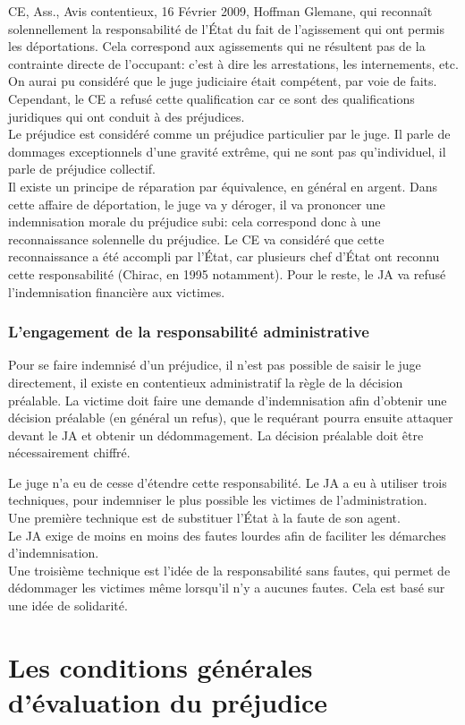 \documentclass[10pt, a4paper, openany]{book}
\begin{document}
CE, Ass., Avis contentieux, 16 Février 2009, Hoffman Glemane, qui reconnaît solennellement la responsabilité de l'État du fait de l'agissement qui ont permis les déportations. Cela correspond aux agissements qui ne résultent pas de la contrainte directe de l'occupant: c'est à dire les arrestations, les internements, etc. \\
On aurai pu considéré que le juge judiciaire était compétent, par voie de faits. Cependant, le CE a refusé cette qualification car ce sont des qualifications juridiques qui ont conduit à des préjudices. \\
Le préjudice est considéré comme un préjudice particulier par le juge. Il parle de dommages exceptionnels d'une gravité extrême, qui ne sont pas qu'individuel, il parle de préjudice collectif. \\
Il existe un principe de réparation par équivalence, en général en argent. Dans cette affaire de déportation, le juge va y déroger, il va prononcer une indemnisation morale du préjudice subi: cela correspond donc à une reconnaissance solennelle du préjudice. Le CE va considéré que cette reconnaissance a été accompli par l'État, car plusieurs chef d'État ont reconnu cette responsabilité (Chirac, en 1995 notamment). Pour le reste, le JA va refusé l'indemnisation financière aux victimes. 

\subsection{L'engagement de la responsabilité administrative}

Pour se faire indemnisé d'un préjudice, il n'est pas possible de saisir le juge directement, il existe en contentieux administratif la règle de la décision préalable. La victime doit faire une demande d'indemnisation afin d'obtenir une décision préalable (en général un refus), que le requérant pourra ensuite attaquer devant le JA et obtenir un dédommagement. La décision préalable doit être nécessairement chiffré.


Le juge n'a eu de cesse d'étendre cette responsabilité. Le JA a eu à utiliser trois techniques, pour indemniser le plus possible les victimes de l'administration. \\
Une première technique est de substituer l'État à la faute de son agent. \\
Le JA exige de moins en moins des fautes lourdes afin de faciliter les démarches d'indemnisation. \\
Une troisième technique est l'idée de la responsabilité sans fautes, qui permet de dédommager les victimes même lorsqu'il n'y a aucunes fautes. Cela est basé sur une idée de solidarité.


\chapter{Les conditions générales d'évaluation du préjudice}
\end{document}
